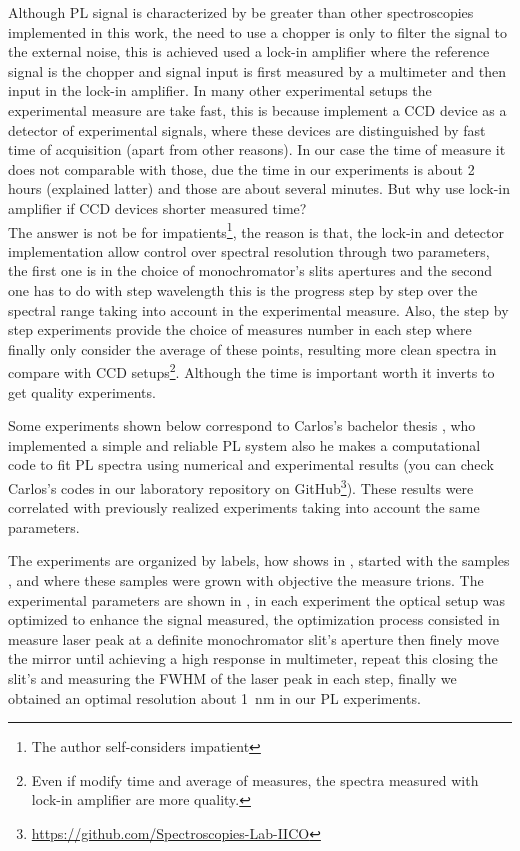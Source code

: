 Although PL signal is characterized by be greater than other spectroscopies implemented in this work, the need to use a chopper is only to filter the signal to the external noise, this is achieved used a lock-in amplifier where the reference signal is the chopper and signal input is first measured by a multimeter and then input in the lock-in amplifier. In many other experimental setups the experimental measure are take  fast,  this is because  implement a CCD device as a detector of experimental signals, where  these devices are distinguished by fast time of acquisition (apart from other reasons). In our case the time of measure it does not comparable with those, due the time in our experiments is about 2 hours (explained latter) and those are about several minutes. But why use lock-in amplifier if CCD devices shorter measured time?\\
The answer is not be for impatients\footnote{The author self-considers impatient}, the reason is that, the lock-in and detector implementation allow control over spectral resolution through two parameters, the first one is in the choice of monochromator's slits apertures and the second one has to do with step wavelength this is the  progress step by step over the spectral range taking into account in the experimental measure. Also, the step by step experiments provide the choice of measures  number in each step where finally only consider the average of these points, resulting more clean spectra in compare with CCD setups\footnote{Even if modify time and average of measures, the spectra measured with lock-in amplifier are more quality.}. Although the time is important  worth it inverts  to  get quality experiments. 

Some experiments shown below correspond to Carlos's bachelor thesis \cite{carlos2020thesis}, who implemented a simple and reliable PL system also he makes a computational code to fit PL spectra using numerical and experimental results (you can check Carlos's codes in our laboratory  repository on GitHub\footnote{\url{https://github.com/Spectroscopies-Lab-IICO}}). These results were correlated with previously   realized  experiments taking into account the same parameters. 


The experiments are organized by labels, how shows in , started with the samples ,  and  where these samples were grown with objective the measure trions. The experimental parameters are shown in , in each experiment the optical setup was optimized to enhance the signal measured, the optimization process consisted in measure laser peak at a definite monochromator slit's aperture then finely move the mirror until achieving a high response in multimeter, repeat this closing the slit's and measuring the FWHM of the laser peak in each step, finally we obtained an optimal resolution about 1 nm in our \gls{PL} experiments. 

